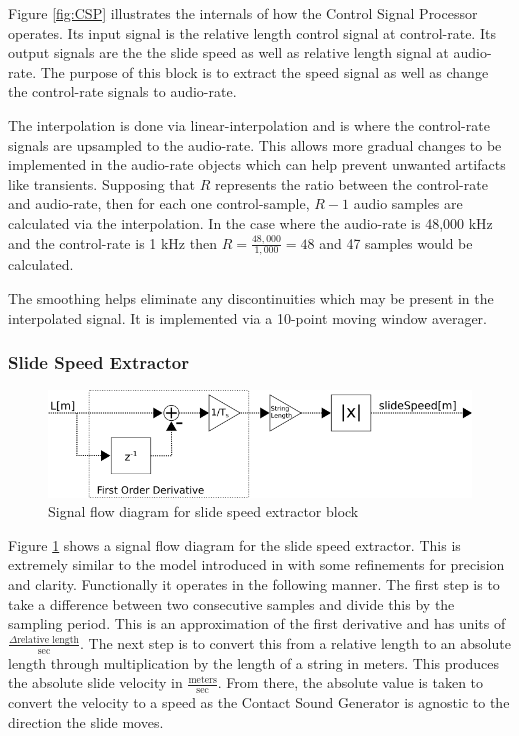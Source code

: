 \documentclass[../main.tex]{subfiles}
\begin{document}
Figure \ref{fig:CSP} illustrates the internals of how the Control Signal Processor operates. Its input signal is the relative length control signal at control-rate. Its output signals are the the slide speed as well as relative length signal at audio-rate. The purpose of this block is to extract the speed signal as well as change the control-rate signals to audio-rate.

The interpolation is done via linear-interpolation and is where the control-rate signals are upsampled to the audio-rate. This allows more gradual changes to be implemented in the audio-rate objects which can help prevent unwanted artifacts like transients. Supposing that $R$ represents the ratio between the control-rate and audio-rate, then for each one control-sample, $R-1$ audio samples are calculated via the interpolation. In the case where the audio-rate is 48,000 kHz and the control-rate is 1 kHz then $R = \frac{48,000}{1,000} = 48$ and 47 samples would be calculated.

The smoothing helps eliminate any discontinuities which may be present in the interpolated signal. It is implemented via a 10-point moving window averager.

\subsubsection{Slide Speed Extractor}

\begin{figure}[h]
    \centering
    \includegraphics[scale=.5]{./images/diagrams/slideSpeedExtractor.png}
    \caption{Signal flow diagram for slide speed extractor block}
    \label{fig:SSE}
\end{figure}

Figure \ref{fig:SSE} shows a signal flow diagram for the slide speed extractor. This is extremely similar to the model introduced in  with some refinements for precision and clarity. Functionally it operates in the following manner. The first step is to take a difference between two consecutive samples and divide this by the sampling period. This is an approximation of the first derivative and has units of $\frac{\Delta \text{relative length}}{\text{sec}}$. The next step is to convert this from a relative length to an absolute length through multiplication by the length of a string in meters. This produces the absolute slide velocity in $\frac{\text{meters}}{\text{sec}}$. From there, the absolute value is taken to convert the velocity to a speed as the Contact Sound Generator is agnostic to the direction the slide moves.
\end{document}
